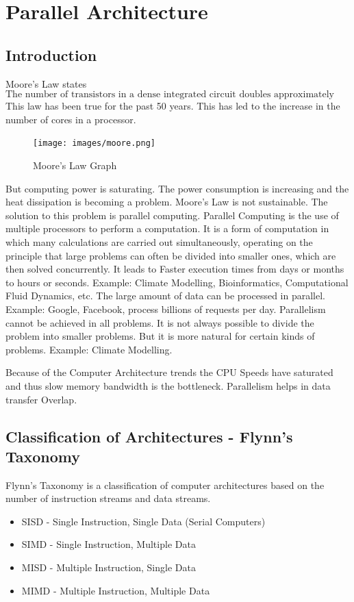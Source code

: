 \documentclass[12pt]{book}
\begin{document}
 
















\chapter{Parallel Architecture}
\section{Introduction}
Moore's Law states
\begin{equation}
    \text{The number of transistors in a dense integrated circuit doubles approximately every two years.}
\end{equation}
This law has been true for the past 50 years. This has led to the increase in the number of cores in a processor.
\begin{figure}[H]
    \centering
    \texttt{[image: images/moore.png]}
    \caption{Moore's Law Graph}
\end{figure} 
But computing power is saturating. The power consumption is increasing and the heat dissipation is becoming a problem.
Moore's Law is not sustainable. The solution to this problem is parallel computing. 
Parallel Computing is the use of multiple processors to perform a computation. It is a form of computation in which many calculations are carried out simultaneously, operating on the principle that large problems can often be divided into smaller ones, which are then solved concurrently.
It leads to Faster execution times from days or months to hours or seconds. Example: Climate Modelling,
Bioinformatics, Computational Fluid Dynamics, etc.
The large amount of data can be processed in parallel. Example: Google, Facebook, process billions of requests per day.
Parallelism cannot be achieved in all problems. It is not always possible to divide the problem into smaller problems. But it is
more natural for certain kinds of problems. Example: Climate Modelling.

Because of the Computer Architecture trends the CPU Speeds have saturated and thus slow memory bandwidth is the bottleneck.
Parallelism helps in data transfer Overlap.

\section{Classification of Architectures - Flynn's Taxonomy}
Flynn's Taxonomy is a classification of computer architectures based on the number of instruction streams and data streams.
\begin{itemize}
    \item SISD - Single Instruction, Single Data (Serial Computers)
    \item SIMD - Single Instruction, Multiple Data
    \item MISD - Multiple Instruction, Single Data
    \item MIMD - Multiple Instruction, Multiple Data
\end{itemize}
\end{document}
